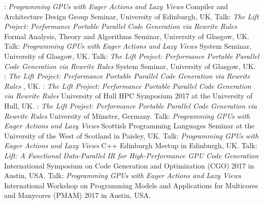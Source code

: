          {:
          \emph{Programming GPUs with Eager Actions and Lazy Views}\newline
         \small Compiler and Architecture Design Group Seminar, University of Edinburgh, UK.}
         {Talk: \emph{The Lift Project: Performance Portable Parallel Code Generation via Rewrite Rules}\newline
         \small Formal Analysis, Theory and Algorithms Seminar, University of Glasgow, UK.}
         {Talk: \emph{Programming GPUs with Eager Actions and Lazy Views}\newline
         \small System Seminar, University of Glasgow, UK.}
         {Talk: \emph{The Lift Project: Performance Portable Parallel Code Generation via Rewrite Rules}\newline
         \small System Seminar, University of Glasgow, UK.}
         {:
          \emph{The Lift Project: Performance Portable Parallel Code Generation via Rewrite Rules}\newline
         \small {}, UK.}
         {:\newline
          \emph{The Lift Project: Performance Portable Parallel Code Generation via Rewrite Rules}\newline
         \small University of Hull HPC Symposium 2017 at the University of Hull, UK.}
         {:\newline
          \emph{The Lift Project: Performance Portable Parallel Code Generation via Rewrite Rules}\newline
         \small University of Münster, Germany.}
         {Talk: \emph{Programming GPUs with Eager Actions and Lazy Views}\newline
         \small Scottish Programming Languages Seminar at the University of the West of Scotland in Paisley, UK.}
         {Talk: \emph{Programming GPUs with Eager Actions and Lazy Views}\newline
         \small C++ Edinburgh Meetup in Edinburgh, UK.}
         {Talk: \emph{Lift: A Functional Data-Parallel IR for High-Performance GPU Code Generation}\newline
          \small International Symposium on Code Generation and Optimization (CGO) 2017 in Austin, USA.}
         {Talk: \emph{Programming GPUs with Eager Actions and Lazy Views}\newline
          \small  International Workshop on Programming Models and Applications for Multicores and Manycores (PMAM) 2017 in Austin, USA.}
